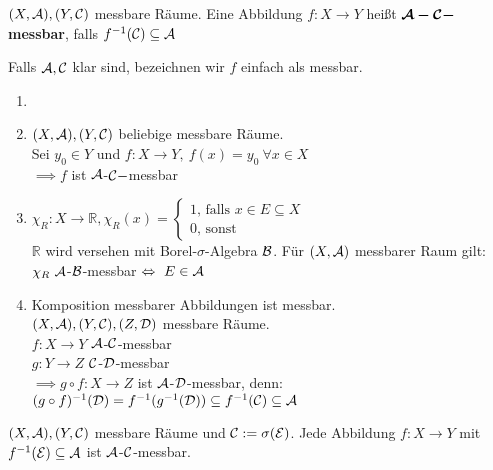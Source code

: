   \begin{definition}
    $(X, \mathcal{A}), (Y, \mathcal{C})$ messbare Räume. Eine Abbildung $f: X \to Y$ heißt $\bm{\mathcal{A}-\mathcal{C}-}$\textbf{messbar}, falls $f^{-1}(\mathcal{C}) \subseteq{\mathcal{A}}$
  \end{definition}

  \begin{notation}
    Falls $\mathcal{A}, \mathcal{C}$ klar sind, bezeichnen wir $f$ einfach als messbar. 
  \end{notation}

  \begin{example}
    \begin{enumerate}
      \item[]
      \item $(X, \mathcal{A}), (Y, \mathcal{C})$ beliebige messbare Räume.\\
            Sei $y_0 \in Y$ und $f: X \to Y, \ f(x) = y_0 \ \forall x \in X$\\
            $\implies f$ ist $\mathcal{A}$-$\mathcal{C}-$messbar
      \item $\chi_R: X \to \mathbb{R}, \chi_R(x) = \begin{cases} 1 \text{, falls } x \in E \subseteq X \\ 0 \text{, sonst}\end{cases}$\\
            $\mathbb{R}$ wird versehen mit Borel-$\sigma$-Algebra $\mathcal{B}$. Für $(X, \mathcal{A})$ messbarer Raum gilt:\\
            $\chi_R \ \mathcal{A}$-$\mathcal{B}$-messbar $\Leftrightarrow \ E \in \mathcal{A}$
      \item Komposition messbarer Abbildungen ist messbar.\\
            $(X, \mathcal{A}), (Y, \mathcal{C}), (Z, \mathcal{D})$ messbare Räume.\\
            $f:X  \to Y$ $\mathcal{A}$-$\mathcal{C}$-messbar\\
            $g:Y \to Z$ $\mathcal{C}$-$\mathcal{D}$-messbar\\
            $\implies g \circ f: X \to Z$ ist $\mathcal{A}$-$\mathcal{D}$-messbar, denn:\\
            $(g \circ f)^{-1}(\mathcal{D}) = f^{-1}(g^{-1}(\mathcal{D})) \subseteq f^{-1}(\mathcal{C}) \subseteq \mathcal{A}$
    \end{enumerate}
  \end{example}

  \begin{lemma}
    $(X, \mathcal{A}), (Y, \mathcal{C})$ messbare Räume und $\mathcal{C} := \sigma(\mathcal{E})$. Jede Abbildung $f: X \to Y$ mit $f^{-1}(\mathcal{E}) \subseteq \mathcal{A}$ ist $\mathcal{A}$-$\mathcal{C}$-messbar.
  \end{lemma}

